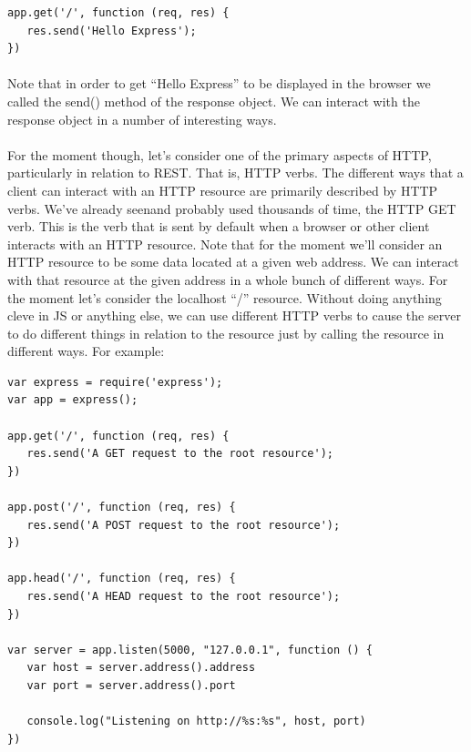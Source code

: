 \documentclass[10pt, a4paper, twosize]{article}
\begin{document}
\begin{lstlisting}
app.get('/', function (req, res) {
   res.send('Hello Express');
})
\end{lstlisting}

\paragraph{} Note that in order to get ``Hello Express'' to be displayed in the browser we called the send() method of the response object. We can interact with the response object in a number of interesting ways.

\paragraph{} For the moment though, let's consider one of the primary aspects of HTTP, particularly in relation to REST. That is, HTTP verbs. The different ways that a client can interact with an HTTP resource are primarily described by HTTP verbs. We've already seenand probably used thousands of time, the HTTP GET verb. This is the verb that is sent by default when a browser or other client interacts with an HTTP resource. Note that for the moment we'll consider an HTTP resource to be some data located at a given web address. We can interact with that resource at the given address in a whole bunch of different ways. For the moment let's consider the localhost ``/'' resource. Without doing anything cleve in JS or anything else, we can use different HTTP verbs to cause the server to do different things in relation to the resource just by calling the resource in different ways. For example:


\begin{lstlisting}
var express = require('express');
var app = express();

app.get('/', function (req, res) {
   res.send('A GET request to the root resource');
})

app.post('/', function (req, res) {
   res.send('A POST request to the root resource');
})

app.head('/', function (req, res) {
   res.send('A HEAD request to the root resource');
})

var server = app.listen(5000, "127.0.0.1", function () {
   var host = server.address().address
   var port = server.address().port
   
   console.log("Listening on http://%s:%s", host, port)
})
\end{lstlisting}
\end{document}
